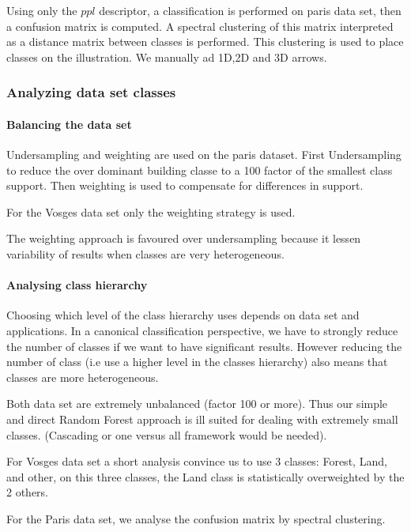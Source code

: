 			Using only the $ppl$ descriptor, a classification is performed on paris data set, then a confusion matrix is computed.
			A spectral clustering of this matrix interpreted as a distance matrix between classes is performed. This clustering is used to place classes on the illustration.
			We manually ad 1D,2D and 3D arrows. 
		
		\subsubsection{Analyzing data set classes}
			\paragraph{Balancing the data set}  
				Undersampling and weighting are used on the paris dataset. First Undersampling to reduce the over dominant building classe to a 100 factor of the smallest class support. Then weighting is used to compensate for differences in support.
				
				For the Vosges data set only the weighting strategy is used.
				
				The weighting approach is favoured over undersampling because it lessen variability of results when classes are very heterogeneous.
				
				
			\paragraph{Analysing class hierarchy} 
		 
				Choosing which level of the class hierarchy uses depends on data set and applications.
				In a canonical classification perspective, we have to strongly reduce the number of classes if we want to have significant results.
				However reducing the number of class (i.e use a higher level in the classes hierarchy) also means that classes are more heterogeneous.
				
				Both data set are extremely unbalanced (factor 100 or more). Thus our simple and direct Random Forest approach is ill suited for dealing with extremely small classes. (Cascading or one versus all framework would be needed).
				
				For Vosges data set a short analysis convince us to use 3 classes: Forest, Land, and other, on this three classes, the Land class is statistically overweighted by the 2 others.	
				
				For the Paris data set, we analyse the confusion matrix by spectral clustering.
				
